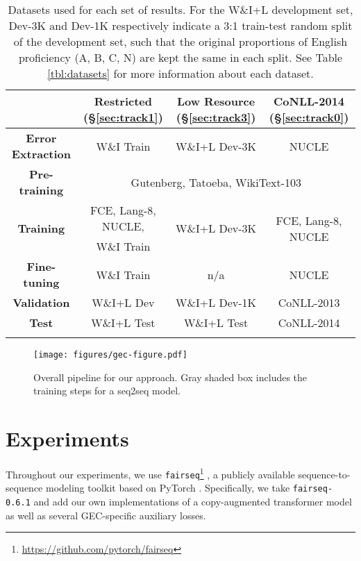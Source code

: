 \documentclass[11pt,a4paper]{article}
\begin{document}
\begin{table*}[t]
    \centering
    \begin{tabular}{cccc}
        \Xhline{1.1pt}
         & {\bf Restricted (\S\ref{sec:track1})} & {\bf Low Resource (\S\ref{sec:track3})} & {\bf CoNLL-2014 (\S\ref{sec:track0})} \\ \hline
        {\bf Error Extraction} & W\&I Train & W\&I+L Dev-3K & NUCLE \\ \hline
        {\bf Pre-training} & \multicolumn{3}{c}{Gutenberg, Tatoeba, WikiText-103} \\ \hline
        \multirow{2}{*}{\bf Training} & FCE, Lang-8, NUCLE, & \multirow{2}{*}{W\&I+L Dev-3K} & \multirow{2}{*}{FCE, Lang-8, NUCLE} \\
         & W\&I Train & & \\
        \hline
        {\bf Fine-tuning} & W\&I Train & n/a & NUCLE \\ \hline
        {\bf Validation} & W\&I+L Dev & W\&I+L Dev-1K & CoNLL-2013 \\ \hline
        {\bf Test} & W\&I+L Test & W\&I+L Test & CoNLL-2014 \\
        \Xhline{1.1pt}
        \end{tabular}
    \caption{Datasets used for each set of results. 
    For the W\&I+L development set, Dev-3K and Dev-1K respectively indicate a 3:1 train-test random split of the development set, such that the original proportions of English proficiency (A, B, C, N) are kept the same in each split.
See Table \ref{tbl:datasets} for more information about each dataset.
    }
    \label{tbl:data_usage}
\end{table*}



\begin{figure*}[t]
    \centering
    \texttt{[image: figures/gec-figure.pdf]}
    \caption{Overall pipeline for our approach. 
    Gray shaded box includes the training steps for a seq2seq model. 
}
    \label{fig:pipeline}
\end{figure*}


\section{Experiments}

Throughout our experiments, we use \texttt{fairseq}\footnote{\url{https://github.com/pytorch/fairseq}} \cite{ott2019fairseq}, a publicly available sequence-to-sequence modeling toolkit based on PyTorch \cite{paszke2017automatic}. 
Specifically, we take \texttt{fairseq-0.6.1} and add our own implementations of a copy-augmented transformer model as well as several GEC-specific auxiliary losses. 
\end{document}
